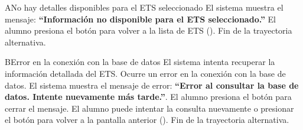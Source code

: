 \begin{UCtrayectoriaA}{A}{No hay detalles disponibles para el ETS seleccionado}
	\UCpaso El sistema muestra el mensaje: \textbf{``Información no disponible para el ETS seleccionado.''}
	\UCpaso[\UCactor] El alumno presiona el botón  para volver a la lista de ETS ().
	\UCpaso Fin de la trayectoria alternativa.
\end{UCtrayectoriaA}

\begin{UCtrayectoriaA}{B}{Error en la conexión con la base de datos}
	\UCpaso El sistema intenta recuperar la información detallada del ETS.
	\UCpaso Ocurre un error en la conexión con la base de datos.
	\UCpaso El sistema muestra el mensaje de error: \textbf{``Error al consultar la base de datos. Intente nuevamente más tarde.''}.
	\UCpaso[\UCactor] El alumno presiona el botón  para cerrar el mensaje.
	\UCpaso[\UCactor] El alumno puede intentar la consulta nuevamente o presionar el botón  para volver a la pantalla anterior ().
	\UCpaso Fin de la trayectoria alternativa.
\end{UCtrayectoriaA}



